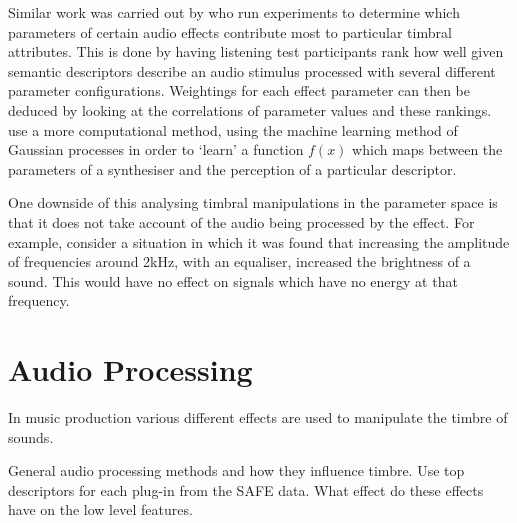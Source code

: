		Similar work was carried out by \citet{sabin2011weighting} who run experiments to determine which
		parameters of certain audio effects contribute most to particular timbral attributes. This is done by
		having listening test participants rank how well given semantic descriptors describe an audio stimulus
		processed with several different parameter configurations. Weightings for each effect parameter can then be
		deduced by looking at the correlations of parameter values and these rankings. \citet{huang2014active} use
		a more computational method, using the machine learning method of Gaussian processes in order to `learn' a
		function $f(x)$ which maps between the parameters of a synthesiser and the perception of a particular
		descriptor.

		One downside of this analysing timbral manipulations in the parameter space is that it does not take
		account of the audio being processed by the effect. For example, consider a situation in which it was found
		that increasing the amplitude of frequencies around 2kHz, with an equaliser, increased the brightness of a
		sound. This would have no effect on signals which have no energy at that frequency.

\section{Audio Processing}
\label{sec:Timbre-AudioProcessing}
\note
{
	\citep{verfaille2006an, eichas2015feature}

	In music production various different effects are used to manipulate the timbre of sounds.

	General audio processing methods and how they influence timbre. Use top descriptors for each plug-in from the SAFE
	data. What effect do these effects have on the low level features.
}
